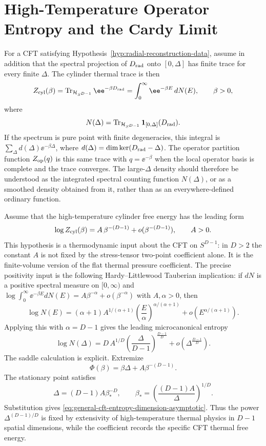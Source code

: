 \section{High-Temperature Operator Entropy and the Cardy Limit}
\label{sec:cardy-operator-entropy}

For a CFT satisfying Hypothesis~\ref{hyp:radial-reconstruction-data}, assume
in addition that the spectral projection of \(D_{\rm rad}\) onto
\([0,\Delta]\) has finite trace for every finite \(\Delta\).  The cylinder
thermal trace is then
\begin{equation}
  Z_{\rm cyl}(\beta)
  =
  \operatorname{Tr}_{\mathcal H_{S^{D-1}}}
  \ee^{-\beta D_{\rm rad}}
  =
  \int_{0}^{\infty}\ee^{-\beta E}\,dN(E),
  \qquad
  \beta>0,
  \label{eq:cylinder-thermal-trace}
\end{equation}
where
\[
  N(\Delta)
  =
  \operatorname{Tr}_{\mathcal H_{S^{D-1}}}
  \mathbf 1_{[0,\Delta]}(D_{\rm rad}).
\]
If the spectrum is pure point with finite degeneracies, this integral is
\(\sum_\Delta d(\Delta)\ee^{-\beta\Delta}\), where
\(d(\Delta)=\dim\ker(D_{\rm rad}-\Delta)\).  The operator partition function
\(Z_{\rm op}(q)\) is this same trace with \(q=\ee^{-\beta}\) when the local
operator basis is complete and the trace converges.  The large-\(\Delta\)
density should therefore be understood as the integrated spectral counting
function \(N(\Delta)\), or as a smoothed density obtained from it, rather than
as an everywhere-defined ordinary function.

Assume that the high-temperature cylinder free energy has the leading form
\begin{equation}
  \log Z_{\rm cyl}(\beta)
  =
  A\,\beta^{-(D-1)}+o(\beta^{-(D-1)}),
  \qquad
  A>0 .
  \label{eq:cylinder-high-temp-free-energy}
\end{equation}
This hypothesis is a thermodynamic input about the CFT on
\(S^{D-1}\): in \(D>2\) the constant \(A\) is not fixed by the stress-tensor
two-point coefficient alone.  It is the finite-volume version of the flat
thermal pressure coefficient.  The precise positivity input is the following
Hardy--Littlewood Tauberian implication: if \(dN\) is a positive spectral
measure on \([0,\infty)\) and
\(\log\int_0^\infty\ee^{-\beta E}dN(E)=A\beta^{-\alpha}+o(\beta^{-\alpha})\)
with \(A,\alpha>0\), then
\[
  \log N(E)
  =
  (\alpha+1)A^{1/(\alpha+1)}
  \left(\frac{E}{\alpha}\right)^{\alpha/(\alpha+1)}
  +o(E^{\alpha/(\alpha+1)}).
\]
Applying this with \(\alpha=D-1\) gives the leading microcanonical entropy
\begin{equation}
  \log N(\Delta)
  =
  D\,A^{1/D}
  \left(\frac{\Delta}{D-1}\right)^{\frac{D-1}{D}}
  +o(\Delta^{\frac{D-1}{D}}).
  \label{eq:general-cft-entropy-dimension-asymptotic}
\end{equation}
The saddle calculation is explicit.  Extremize
\[
  \Phi(\beta)=\beta\Delta+A\beta^{-(D-1)}.
\]
The stationary point satisfies
\[
  \Delta=(D-1)A\beta_\ast^{-D},
  \qquad
  \beta_\ast=\left(\frac{(D-1)A}{\Delta}\right)^{1/D}.
\]
Substitution gives \eqref{eq:general-cft-entropy-dimension-asymptotic}.  Thus
the power \(\Delta^{(D-1)/D}\) is fixed by extensivity of high-temperature
thermal physics in \(D-1\) spatial dimensions, while the coefficient records
the specific CFT thermal free energy.

